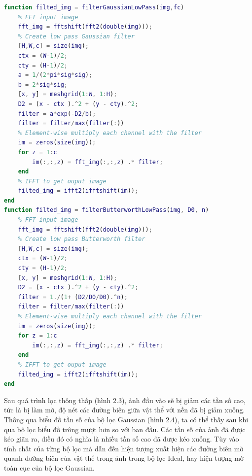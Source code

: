 \begin{lstlisting}[language = Matlab]
function filted_img = filterGaussianLowPass(img,fc)
    % FFT input image
    fft_img = fftshift(fft2(double(img)));
    % Create low pass Gaussian filter
    [H,W,c] = size(img);
    ctx = (W-1)/2;
    cty = (H-1)/2;
    a = 1/(2*pi*sig*sig);
    b = 2*sig*sig;
    [x, y] = meshgrid(1:W, 1:H);
    D2 = (x - ctx ).^2 + (y - cty).^2;
    filter = a*exp(-D2/b);
    filter = filter/max(filter(:))
    % Element-wise multiply each channel with the filter
    im = zeros(size(img));
    for z = 1:c
        im(:,:,z) = fft_img(:,:,z) .* filter;
    end 
    % IFFT to get ouput image
    filted_img = ifft2(ifftshift(im));
end
function filted_img = filterButterworthLowPass(img, D0, n)
    % FFT input image
    fft_img = fftshift(fft2(double(img)));
    % Create low pass Butterworth filter
    [H,W,c] = size(img);
    ctx = (W-1)/2;
    cty = (H-1)/2;
    [x, y] = meshgrid(1:W, 1:H);
    D2 = (x - ctx ).^2 + (y - cty).^2;
    filter = 1./(1+ (D2/D0/D0).^n);
    filter = filter/max(filter(:))
    % Element-wise multiply each channel with the filter
    im = zeros(size(img));
    for z = 1:c
        im(:,:,z) = fft_img(:,:,z) .* filter;
    end 
    % IFFT to get ouput image
    filted_img = ifft2(ifftshift(im));
end
\end{lstlisting}
\par Sau quá trình lọc thông thấp (hình 2.3), ảnh đầu vào sẽ bị giảm các tần số cao, tức là bị làm mờ, độ nét các đường biên giữa vật thể với nền đã bị giảm xuống. Thông qua biểu đồ tần số của bộ lọc Gaussian (hình 2.4), ta có thể thấy sau khi qua bộ lọc biểu đồ trông mượt hơn so với ban đầu. Các tần số của ảnh đã được kéo giãn ra, điều đó có nghĩa là nhiều tần số cao đã được kéo xuống. Tùy vào tính chất của từng bộ lọc mà dẫn đến hiện tượng xuất hiện các đường biên mờ quanh đường biên của vật thể trong ảnh trong bộ lọc Ideal, hay hiện tượng mờ toàn cục của bộ lọc Gaussian. 
